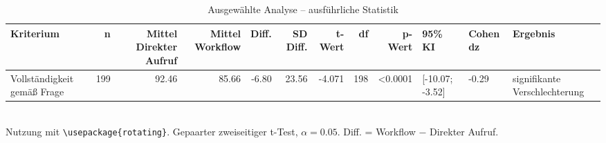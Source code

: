 \begin{table}
\centering
\caption{Ausgewählte Analyse -- ausführliche Statistik}
\begin{tabular}{lrrrrrrrrlll}
\toprule
Kriterium & n & Mittel Direkter Aufruf & Mittel Workflow & Diff. & SD Diff. & t-Wert & df & p-Wert & 95\% KI & Cohen dz & Ergebnis \\
\midrule
Vollständigkeit gemäß Frage & 199 & 92.46 & 85.66 & -6.80 & 23.56 & -4.071 & 198 & <0.0001 & [-10.07; -3.52] & -0.29 & signifikante Verschlechterung \\
\bottomrule
\end{tabular}
\\[2mm]
\footnotesize Nutzung mit \texttt{\textbackslash usepackage\{rotating\}}. Gepaarter zweiseitiger t-Test, $\alpha=0.05$. Diff. = Workflow $-$ Direkter Aufruf.
\end{table}
